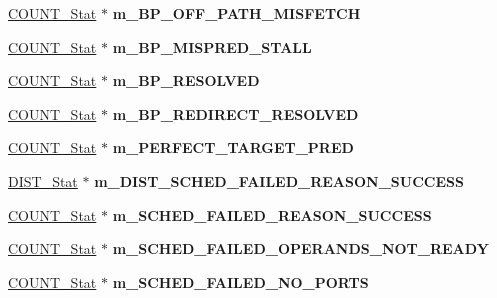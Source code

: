 \begin{DoxyCompactItemize}
\item 
\hypertarget{classall__stats__c_a74d237f2fc21d83e1db9d70d5865a877}{
\hyperlink{classCOUNT__Stat}{COUNT\_\-Stat} $\ast$ {\bfseries m\_\-BP\_\-OFF\_\-PATH\_\-MISFETCH}}
\label{classall__stats__c_a74d237f2fc21d83e1db9d70d5865a877}

\item 
\hypertarget{classall__stats__c_a92d15883a850744cf277fa3d8d6ff6da}{
\hyperlink{classCOUNT__Stat}{COUNT\_\-Stat} $\ast$ {\bfseries m\_\-BP\_\-MISPRED\_\-STALL}}
\label{classall__stats__c_a92d15883a850744cf277fa3d8d6ff6da}

\item 
\hypertarget{classall__stats__c_aff3fa317a2320f64ab482410f45d1f9d}{
\hyperlink{classCOUNT__Stat}{COUNT\_\-Stat} $\ast$ {\bfseries m\_\-BP\_\-RESOLVED}}
\label{classall__stats__c_aff3fa317a2320f64ab482410f45d1f9d}

\item 
\hypertarget{classall__stats__c_a7275054083143d5b1d71432ad12d116d}{
\hyperlink{classCOUNT__Stat}{COUNT\_\-Stat} $\ast$ {\bfseries m\_\-BP\_\-REDIRECT\_\-RESOLVED}}
\label{classall__stats__c_a7275054083143d5b1d71432ad12d116d}

\item 
\hypertarget{classall__stats__c_afb2cba127fb23190ef9dadfc0440663a}{
\hyperlink{classCOUNT__Stat}{COUNT\_\-Stat} $\ast$ {\bfseries m\_\-PERFECT\_\-TARGET\_\-PRED}}
\label{classall__stats__c_afb2cba127fb23190ef9dadfc0440663a}

\item 
\hypertarget{classall__stats__c_a38a094ac1fb1ce1f4adc386dee7ff45d}{
\hyperlink{classDIST__Stat}{DIST\_\-Stat} $\ast$ {\bfseries m\_\-DIST\_\-SCHED\_\-FAILED\_\-REASON\_\-SUCCESS}}
\label{classall__stats__c_a38a094ac1fb1ce1f4adc386dee7ff45d}

\item 
\hypertarget{classall__stats__c_a2c3b755d127bd30f3c66d458439df819}{
\hyperlink{classCOUNT__Stat}{COUNT\_\-Stat} $\ast$ {\bfseries m\_\-SCHED\_\-FAILED\_\-REASON\_\-SUCCESS}}
\label{classall__stats__c_a2c3b755d127bd30f3c66d458439df819}

\item 
\hypertarget{classall__stats__c_abe905f03a4f9c029ca2e995cc3ef48d5}{
\hyperlink{classCOUNT__Stat}{COUNT\_\-Stat} $\ast$ {\bfseries m\_\-SCHED\_\-FAILED\_\-OPERANDS\_\-NOT\_\-READY}}
\label{classall__stats__c_abe905f03a4f9c029ca2e995cc3ef48d5}

\item 
\hypertarget{classall__stats__c_a26c332418c5260e564e1b8826416b124}{
\hyperlink{classCOUNT__Stat}{COUNT\_\-Stat} $\ast$ {\bfseries m\_\-SCHED\_\-FAILED\_\-NO\_\-PORTS}}
\label{classall__stats__c_a26c332418c5260e564e1b8826416b124}


\end{DoxyCompactItemize}
